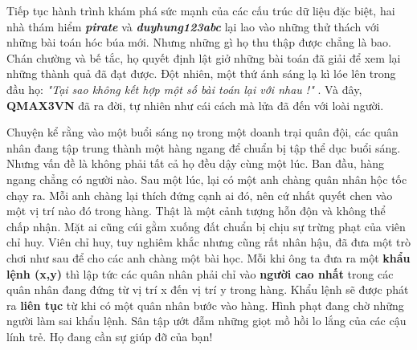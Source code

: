 Tiếp tục hành trình khám phá sức mạnh của các cấu trúc dữ liệu đặc biệt, hai nhà thám hiểm   \textbf{\emph{     pirate    }}   và   \textbf{\emph{     duyhung123abc    }}   lại lao vào những thử thách với những bài toán hóc búa mới. Nhưng những gì họ thu thập được chẳng là bao. Chán chường và bế tắc, họ quyết định lật giở những bài toán đã giải để xem lại những thành quả đã đạt được. Đột nhiên, một thứ ánh sáng lạ kì lóe lên trong đầu họ:   \emph{    "Tại sao không kết hợp một số bài toán lại với nhau !"   }   . Và đây,   \textbf{    QMAX3VN   }   đã ra đời, tự nhiên như cái cách mà lửa đã đến với loài người.  

   Chuyện kể rằng vào một buổi sáng nọ trong một doanh trại quân đội, các quân nhân đang tập trung thành một hàng ngang để chuẩn bị tập thể dục buổi sáng. Nhưng vấn đề là không phải tất cả họ đều dậy cùng một lúc. Ban đầu, hàng ngang chẳng có người nào. Sau một lúc, lại có một anh chàng quân nhân hộc tốc chạy ra. Mỗi anh chàng lại thích đứng cạnh ai đó, nên cứ nhất quyết chen vào một vị trí nào đó trong hàng. Thật là một cảnh tượng hỗn độn và không thể chấp nhận. Mặt ai cũng cúi gằm xuống đất chuẩn bị chịu sự trừng phạt của viên chỉ huy. Viên chỉ huy, tuy nghiêm khắc nhưng cũng rất nhân hậu, đã đưa một trò chơi như sau để cho các anh chàng một bài học. Mỗi khi ông ta đưa ra một   \textbf{    khẩu lệnh (x,y)   }   thì lập tức các quân nhân phải chỉ vào   \textbf{    người cao nhất   }   trong các quân nhân đang đứng từ vị trí x đến vị trí y trong hàng. Khẩu lệnh sẽ được phát ra   \textbf{    liên tục   }   từ khi có một quân nhân bước vào hàng. Hình phạt đang chờ những người làm sai khẩu lệnh. Sân tập ướt đẫm những giọt mồ hồi lo lắng của các cậu lính trẻ. Họ đang cần sự giúp đỡ của bạn!  

\